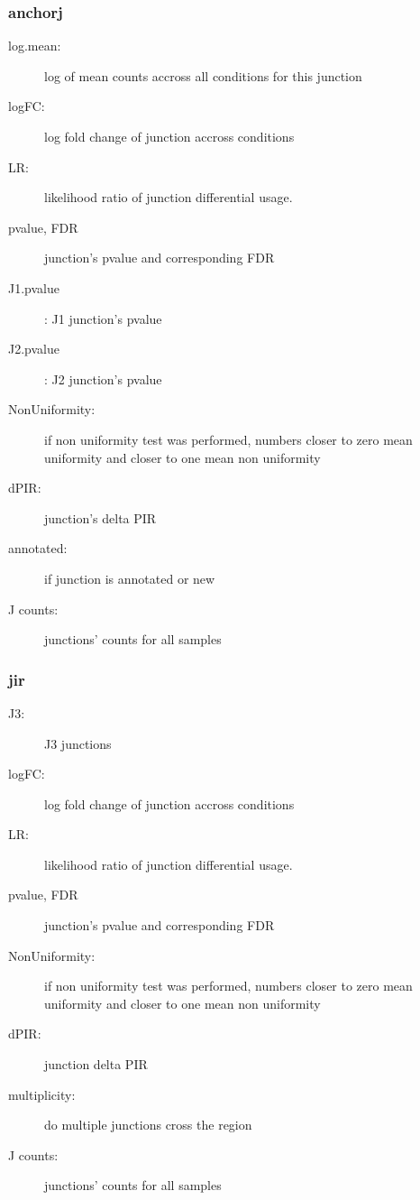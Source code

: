\documentclass{article}
\begin{document}
\subsubsection*{anchorj}
\begin{description}
   \item [log.mean:] log of mean counts accross all conditions for this junction
   \item [logFC:] log fold change of junction accross conditions
   \item [LR:] likelihood ratio of junction differential usage.
   \item [pvalue, FDR] junction's pvalue and corresponding FDR 
   \item [J1.pvalue]: J1 junction's pvalue
   \item [J2.pvalue]: J2 junction's pvalue 
   \item [NonUniformity:] if non uniformity test was performed, numbers closer to zero mean uniformity and closer to one mean non uniformity
   \item [dPIR:] junction's delta PIR
   \item [annotated:] if junction is annotated or new
   \item [J counts:] junctions' counts for all samples
\end{description}   


\subsubsection*{jir}
\begin{description}
   \item [J3:] J3 junctions
   \item [logFC:] log fold change of junction accross conditions
   \item [LR:] likelihood ratio of junction differential usage.
   \item [pvalue, FDR] junction's pvalue and corresponding FDR 
   \item [NonUniformity:] if non uniformity test was performed, numbers closer to zero mean uniformity and closer to one mean non uniformity
   \item [dPIR:] junction delta PIR
   \item [multiplicity:] do multiple junctions cross the region
   \item [J counts:] junctions' counts for all samples
  \end{description}      
 
 
\end{document}
